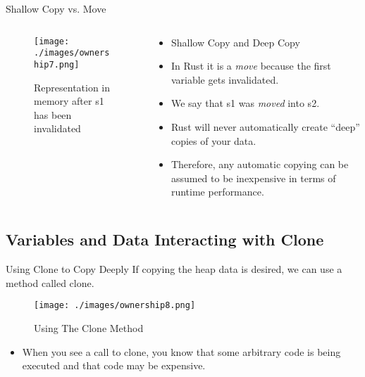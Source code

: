 \documentclass[10pt]{beamer}
\begin{document}
\begin{frame}{Shallow Copy vs. Move}
    \begin{columns}
        \begin{column}{0.5\textwidth}
            \begin{figure}[htpb]
                \centering
                \texttt{[image: ./images/ownership7.png]}
                \caption{Representation in memory after s1 has been invalidated\cite{rust-book}}
            \end{figure}
        \end{column}
        \begin{column}{0.5\textwidth}
            \begin{itemize}
                \item Shallow Copy and Deep Copy
                \item In Rust it is a \textit{move} because the first variable gets invalidated.\cite{rust-book}
                \item We say that s1 was \textit{moved} into s2.\cite{rust-book}
                \item Rust will never automatically create “deep” copies of your data.\cite{rust-book}
                \item Therefore, any automatic copying can be assumed to be inexpensive in terms of runtime performance.\cite{rust-book}
            \end{itemize}
        \end{column}
    \end{columns}

\end{frame}

\subsection{Variables and Data Interacting with Clone}
\begin{frame}{Using Clone to Copy Deeply}
    If copying the heap data is desired, we can use a method called clone.
    \begin{figure}[htpb]
        \centering
        \texttt{[image: ./images/ownership8.png]}
        \caption{Using The Clone Method\cite{rust-book}}
    \end{figure}

    \begin{itemize}
        \item When you see a call to clone, you know that some arbitrary code is being executed and that code may be expensive.\cite{rust-book}
    \end{itemize}
\end{frame}
\end{document}
